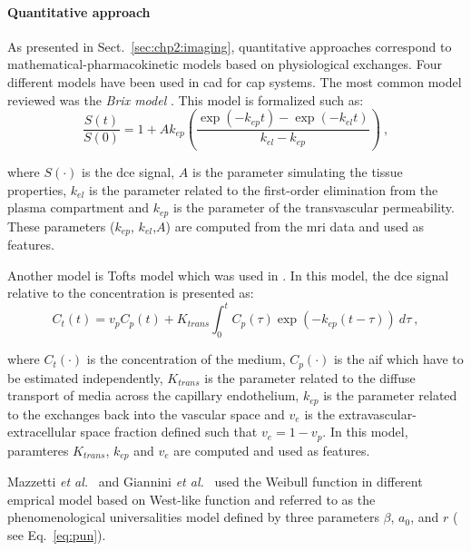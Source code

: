 \paragraph{Quantitative approach}
As presented in Sect.~\ref{sec:chp2:imaging}, quantitative approaches correspond to mathematical-pharmacokinetic models based on physiological exchanges.
Four different models have been used in \ac{cad} for \ac{cap} systems.
The most common model reviewed was the \textit{Brix model} \cite{Artan2009,Artan2010,Sung2011,Liu2009,Ozer2009,Ozer2010}.
This model is formalized such as:
\begin{equation}
	\frac{S(t)}{S(0)} = 1 + A k_{ep} \left( \frac{\exp( -k_{ep} t ) - \exp( -k_{el} t )}{k_{el} - k_{ep}} \right) \ ,
	\label{eq:brixmod}
\end{equation}

\noindent where $S(\cdot)$ is the \ac{dce} signal, $A$ is the parameter simulating the tissue properties, $k_{el}$ is the parameter related to the first-order elimination from the plasma compartment and $k_{ep}$ is the parameter of the transvascular permeability.
These parameters ($k_{ep}$, $k_{el}$,$A$) are computed from the \ac{mri} data and used as features.

Another model is Tofts model \cite{Tofts1997} which was used in \cite{Langer2009,Giannini2013,Niaf2011,Niaf2012,Mazzetti2011}.
In this model, the \ac{dce} signal relative to the concentration is presented as:
\begin{equation}
	C_t(t) = v_p C_p(t) + K_{trans} \int_{0}^{t} C_p(\tau) \exp( -k_{ep}(t-\tau) ) \ d\tau \ ,
	\label{eq:tofts} 
\end{equation}

\noindent where $C_t(\cdot)$ is the concentration of the medium, $C_p(\cdot)$ is the \ac{aif} which have to be estimated independently, $K_{trans}$ is the parameter related to the diffuse transport of media across the capillary endothelium, $k_{ep}$ is the parameter related to the exchanges back into the vascular space and $v_e$ is the extravascular-extracellular space fraction defined such that $v_e = 1 - v_p$.
In this model, paramteres $K_{trans}$, $k_{ep}$ and $v_e$ are computed and used as features.

Mazzetti \textit{et al.}~\cite{Mazzetti2011} and Giannini \textit{et al.}~\cite{Giannini2013} used the Weibull function in different emprical model based on West-like function and referred to as the phenomenological universalities model \cite{Castorina2006} defined by three parameters $\beta$, $a_{0}$, and $r$ ( see Eq.~\ref{eq:pun}).

